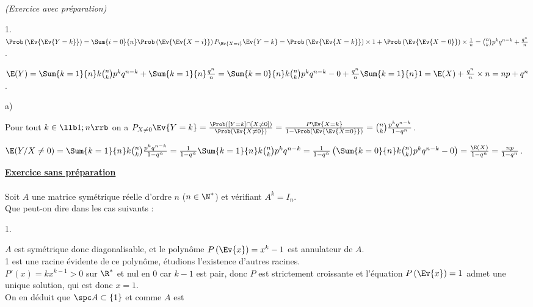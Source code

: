 \documentclass[11pt]{article}%
\begin{document}
\begin{exercice}{\it (Exercice avec préparation)}
\begin{noliste}{1.}
 $\Prob\left(\Ev{\Ev{ Y = k}}\right) = \Sum{i = 0}{n}
\Prob\left(\Ev{\Ev{ X = i}}\right) P_{\Ev{X = i} } \Ev{Y = k} =
\Prob\left(\Ev{\Ev{ X = k}}\right) \times 1 + \Prob\left(\Ev{\Ev{X =
0}}\right) \times \frac{1}{n} = \binom{n}{k} p^{k} q^{n-k} +
\frac{q^{n}}{n}$. \\
 \item $\E(Y) = \Sum{k = 1}{n} k \binom{n}{k} p^{k} q^{n-k} + \Sum{k =
1}{n} \frac{q^{n}}{n} = \Sum{k = 0}{n} k \binom{n}{k} p^{k} q^{n-k} - 0
+ \frac{q^{n}}{n} \Sum{k = 1}{n} 1 = \E(X) + \frac{q^{n}}{n} \times n =
n p + q^{n}$. \\
 \item 
 \begin{noliste}{a)}
 \setlength{\itemsep}{2mm} 
 \item Pour tout $k \in \llb 1 ; n \rrb$ on a $P_{X \neq 0} \Ev{ Y = k}
= \frac{ \Prob( [Y = k] \cap [X \neq 0])}{\Prob\left(\Ev{ X \neq
0}\right)} = \frac{P \Ev{X = k}}{1 - \Prob\left(\Ev{\Ev{X = 0}}\right)
} = \binom{n}{k} \frac{ p^{k} q^{n-k}}{1 - q^{n}}$. \\
 \item $\E(Y \slash X \neq 0) = \Sum{k = 1}{n} k \binom{n}{k} \frac{
p^{k} q^{n-k}}{1 - q^{n}} = \frac{1}{1 - q^{n}} \Sum{k = 1}{n} k
\binom{n}{k} p^{k} q^{n-k} = \frac{1}{1 - q^{n}} \left( \Sum{k = 0}{n}
k \binom{n}{k} p^{k} q^{n-k} - 0 \right) = \frac{\E(X)}{1 - q^{n}} =
\frac{n p}{1 - q^{n}}$. \\
 \end{noliste}
 \end{noliste}
 \noindent \textbf{\underline{Exercice sans préparation}} \\
\\
 Soit $A$ une matrice symétrique réelle d'ordre $n$ ($n \in \N^*$) et
vérifiant $A^{k} = I_{n}$. \\
 Que peut-on dire dans les cas suivants : \begin{noliste}{1.}
 \setlength{\itemsep}{4mm}
 \item $A$ est symétrique donc diagonalisable, et le polynôme
$P\left(\Ev{x}\right) = x^{k} -1$ est annulateur de $A$. \\
 1 est une racine évidente de ce polynôme, étudions l'existence
d'autres racines. \\
 $P'(x) = k x^{k-1} > 0$ sur $\R^*$ et nul en 0 car $k-1$ est pair,
donc $P$ est strictement croissante et l'équation $P\left(\Ev{x}\right)
= 1$ admet une unique solution, qui est donc $x = 1$. \\
 On en déduit que $\spc A \subset \{ 1 \}$ et comme $A$ est

\end{noliste}
\end{exercice}
\end{document}

